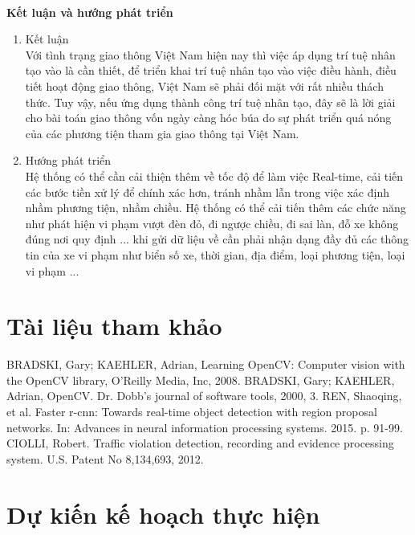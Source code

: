 \documentclass[12pt,twoside,a4paper]{article}
\begin{document}
\leavevmode \\
\textbf {Kết luận và hướng phát triển}
\begin{enumerate}
	\item Kết luận \\
	Với tình trạng giao thông Việt Nam hiện nay thì việc áp dụng trí tuệ nhân tạo vào là cần thiết, để triển khai trí tuệ nhân tạo vào việc điều hành, điều tiết hoạt động giao thông, Việt Nam sẽ phải đối mặt với rất nhiều thách thức. Tuy vậy, nếu ứng dụng thành công trí tuệ nhân tạo, đây sẽ là lời giải cho bài toán giao thông vốn ngày càng hóc búa do sự phát triển quá nóng của các phương tiện tham gia giao thông tại Việt Nam.
	\item Hướng phát triển \\
	Hệ thống có thể cần cải thiện thêm về tốc độ để làm việc Real-time, cải tiến các bước tiền xử lý để chính xác hơn, tránh nhầm lẫn trong việc xác định nhầm phương tiện, nhầm chiều. Hệ thống có thể cải tiến thêm các chức năng như phát hiện vi phạm vượt đèn đỏ, đi ngược chiều, đi sai làn, đỗ xe không đúng nơi quy định ... khi gửi dữ liệu về cần phải nhận dạng đầy đủ các thông tin của xe vi phạm như biển số xe, thời gian, địa điểm, loại phương tiện, loại vi phạm ...
\end{enumerate}
\section{Tài liệu tham khảo}
\renewcommand{\labelenumi}{[\arabic{enumi}]}
\begin{thebibliography}{9}
	 BRADSKI, Gary; KAEHLER, Adrian, Learning OpenCV: Computer vision with the OpenCV library, O'Reilly Media, Inc, 2008.
	 BRADSKI, Gary; KAEHLER, Adrian, OpenCV. Dr. Dobb’s journal of software tools, 2000, 3.
	 REN, Shaoqing, et al. Faster r-cnn: Towards real-time object detection with region proposal networks. In: Advances in neural information processing systems. 2015. p. 91-99.
	 CIOLLI, Robert. Traffic violation detection, recording and evidence processing system. U.S. Patent No 8,134,693, 2012.
\end{thebibliography}

\section{Dự kiến kế hoạch thực hiện}
\end{document}
